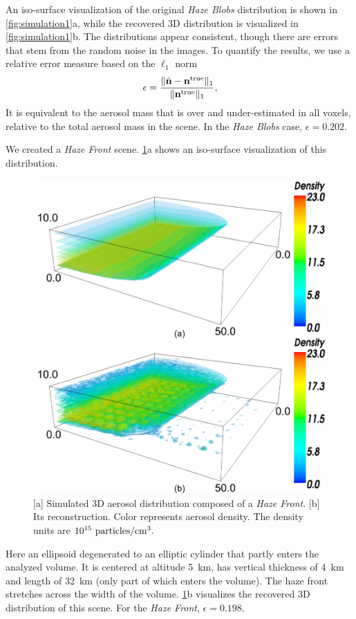 \documentclass[10pt,letterpaper]{article}
\newcommand{\yoavcomment}[1]{}
\renewcommand{\yoavcomment}[1]{#1} %
\begin{document}
An iso-surface visualization of the original {\em Haze Blobs}
distribution is shown in \cref{fig:simulation1}a, while the recovered
3D distribution is visualized in \cref{fig:simulation1}b. The
distributions appear consistent, though there are errors that stem
from the random noise in the images. To quantify the results, we use a
relative error measure based on the $\ell_1$ norm
\begin{equation}
  \label{eq:ndiff}
  \epsilon=\frac{\| \hat{\bf n}  - {\bf n}^{\rm true} \|_1}
  {\| {\bf n}^{\rm true} \|_1} ,
  \hspace{-0.05cm}
\end{equation}
It is equivalent to the aerosol mass that is over and under-estimated
in all voxels, relative to the total aerosol mass in the scene.  In
the {\em Haze Blobs} case, $\epsilon=0.202$.

We created a {\em Haze Front} scene. \cref{fig:simulation2}a shows an
iso-surface visualization of this distribution.
\begin{figure}
  \centering
  \yoavcomment{\includegraphics[width=\columnwidth]{images/simulation2}}
  \caption{\small [a] Simulated 3D aerosol distribution composed of a
    {\em Haze Front}. [b] Its reconstruction. Color represents aerosol
    density. The density units are $10^{15}~{\rm particles}/{\rm
      cm}^3.$}
  \label{fig:simulation2}
\end{figure}
Here an ellipsoid degenerated to an elliptic cylinder that partly
enters the analyzed volume. It is centered at altitude \SI{5}{\km},
has vertical thickness of \SI{4}{\km} and length of \SI{32}{\km} (only
part of which enters the volume). The haze front stretches across the
width of the volume.  \cref{fig:simulation2}b visualizes the recovered
3D distribution of this scene. For the {\em Haze Front},
$\epsilon=0.198$.
\end{document}
